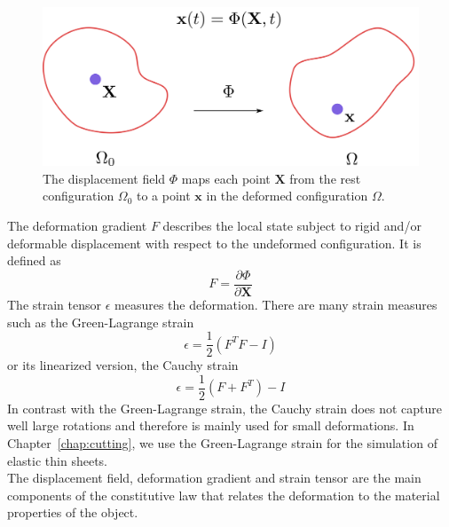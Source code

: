 \begin{figure}[H]
\centering
\includegraphics[scale=0.4]{./images/continuum_mechanics/displacementField.png}
\caption[STAR mechanics: Displacement field]{\label{fig:displacementField}
 The displacement field $\Phi$ maps each point $\mathbf{X}$ from the rest configuration $\Omega_{0}$ to a point $\mathbf{x}$ in the deformed configuration $\Omega$.}
\end{figure}
The deformation gradient $F$ describes the local state subject to rigid and/or deformable displacement with respect to the undeformed configuration. It is defined as
\begin{equation}
\label{eq:deformationGradient}
\displaystyle F = \frac{\partial \Phi}{\partial \mathbf{X}}
\end{equation}
The strain tensor $\epsilon$ measures the deformation.
There are many strain measures such as the Green-Lagrange strain
\begin{equation}
\label{eq:greenLagrangeStrain}
\displaystyle \epsilon = \frac{1}{2}\left(F^{T}F - I\right)
\end{equation}
or its linearized version, the Cauchy strain 
\begin{equation}
\label{eq:cauchyStrain}
\displaystyle \epsilon = \frac{1}{2}\left( F + F^{T} \right)-I
\end{equation}
In contrast with the Green-Lagrange strain, the Cauchy strain does not capture well large rotations and therefore is mainly used for small deformations. In Chapter~\ref{chap:cutting}, we use the Green-Lagrange strain for the simulation of elastic thin sheets.
\\
The displacement field, deformation gradient and strain tensor are the main components of the constitutive law that relates the deformation to the material properties of the object.

